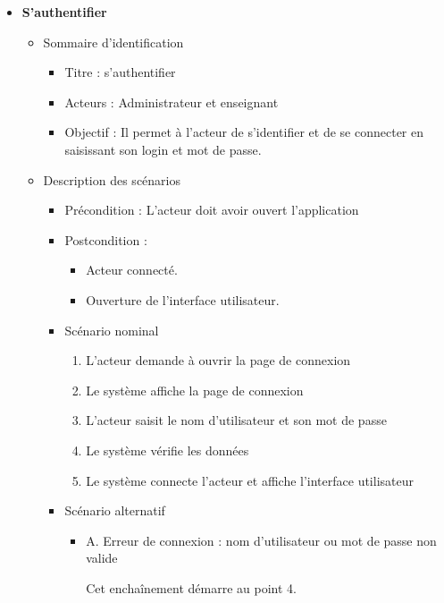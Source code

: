\begin{itemize}
	\item \textbf{S’authentifier}
	      \begin{itemize}
		      \item Sommaire d’identification
		            \begin{itemize}
			            \item Titre : s’authentifier
			            \item Acteurs : Administrateur et enseignant
			            \item Objectif : Il permet à l’acteur de s’identifier et de se connecter en saisissant son login et mot de passe.
		            \end{itemize}
		      \item Description des scénarios
		            \begin{itemize}
			            \item Précondition : L’acteur doit avoir ouvert l’application
			            \item Postcondition :
			                  \begin{itemize}
				                  \item Acteur connecté.
				                  \item Ouverture de l’interface utilisateur.
			                  \end{itemize}
			            \item Scénario nominal
			                  \begin{enumerate}
				                  \item L’acteur demande à ouvrir la page de connexion
				                  \item Le système affiche la page de connexion
				                  \item L’acteur saisit le nom d’utilisateur et son mot de passe
				                  \item Le système vérifie les données
				                  \item Le système connecte l’acteur et affiche l’interface utilisateur
			                  \end{enumerate}
			            \item Scénario alternatif
			                  \begin{itemize}
				                  \item A. Erreur de connexion : nom d'utilisateur ou mot de passe non valide

				                        Cet enchaînement démarre au point 4.


\end{itemize}
\end{itemize}
\end{itemize}
\end{itemize}
